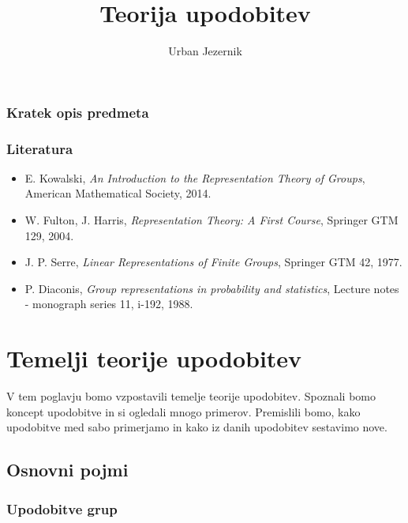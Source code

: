 \documentclass[11pt]{book}
\title{\bf Teorija upodobitev}
\author{Urban Jezernik}
\def\literatura{\color{modra}}
\theoremstyle{definition}
\theoremstyle{zgled}
\theoremstyle{odprtproblem}
\theoremstyle{domacanaloga}
\theoremstyle{izrek}
\begin{document}
\baselineskip=14pt

\maketitle

\setcounter{tocdepth}{1}
\tableofcontents

\newpage

\subsection*{Kratek opis predmeta}


\subsection*{Literatura}

\begin{itemize}
\item {\literatura E. Kowalski, {\em An Introduction to the Representation Theory of Groups}, American Mathematical Society, 2014.} 
\item {\literatura W. Fulton, J. Harris, {\em Representation Theory: A First Course}, Springer GTM 129, 2004.}
\item {\literatura J. P. Serre, {\em Linear Representations of Finite Groups}, Springer GTM 42, 1977.}
\item {\literatura P. Diaconis, {\em Group representations in probability and statistics}, Lecture notes - monograph series 11, i-192, 1988.}
\end{itemize}

\chapter{Temelji teorije upodobitev}

V tem poglavju bomo vzpostavili temelje teorije upodobitev. Spoznali bomo koncept upodobitve in si ogledali mnogo primerov. Premislili bomo, kako upodobitve med sabo primerjamo in kako iz danih upodobitev sestavimo nove.

\section{Osnovni pojmi}

\subsection{Upodobitve grup}
\end{document}
